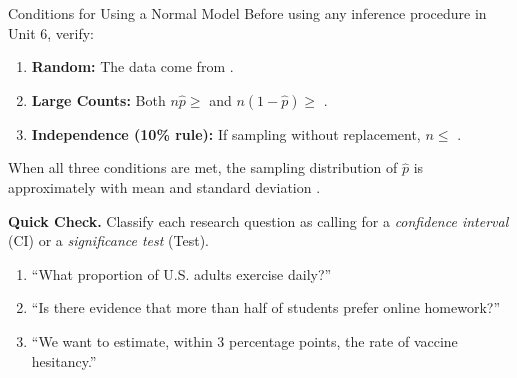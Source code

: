 \documentclass[10pt]{article}
\begin{document}
\vspace{0.1in}

\begin{notesbox}{Conditions for Using a Normal Model}
Before using any inference procedure in Unit 6, verify:

\begin{enumerate}
  \item \textbf{Random:} The data come from \blank{8cm}.
  \item \textbf{Large Counts:} Both $n\hat{p} \ge$ \blank{1cm} and $n(1-\hat{p}) \ge$ \blank{1cm}.
  \item \textbf{Independence (10\% rule):} If sampling without replacement, $n \le$ \blank{4cm}.
\end{enumerate}

When all three conditions are met, the sampling distribution of $\hat p$ is approximately
\blank{8cm} with mean \blank{2.5cm} and standard deviation \blank{4cm}.
\end{notesbox}

\vspace{0.1in}

\begin{practicebox}
\textbf{Quick Check.} Classify each research question as calling for a \emph{confidence interval}
(CI) or a \emph{significance test} (Test).

\begin{enumerate}
  \item ``What proportion of U.S. adults exercise daily?'' \hfill \blank{2.5cm}
  \item ``Is there evidence that more than half of students prefer online homework?'' \hfill \blank{2.5cm}
  \item ``We want to estimate, within 3 percentage points, the rate of vaccine hesitancy.''
        \hfill \blank{2.5cm}
\end{enumerate}
\end{practicebox}
\end{document}
